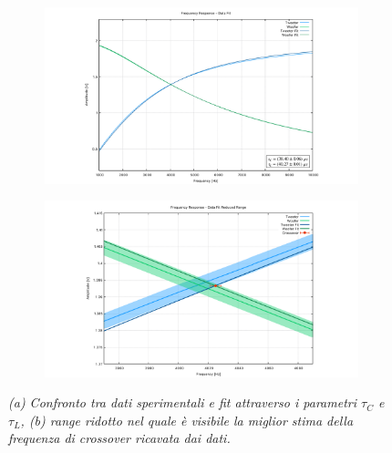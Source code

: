 \documentclass[12pt]{article}
\begin{document}
\begin{figure}[!ht]
\begin{subfigure}{.5\textwidth}
  \centering
  \includegraphics[width=1\linewidth]{../results/CFAmplFit.pdf}
  \caption{\textit{}}
\end{subfigure}%
\hfill
\begin{subfigure}{.5\textwidth}
  \centering
  \includegraphics[width=1\linewidth]{../results/CFAmplRRFit.pdf}
  \caption{\textit{}}
\end{subfigure}
\caption{ \textit{(a) Confronto tra dati sperimentali e fit attraverso i parametri $\tau_C$ e $\tau_L$, (b) range ridotto nel quale è visibile la 
miglior stima della frequenza di crossover ricavata dai dati. }}
\end{figure}
\end{document}
